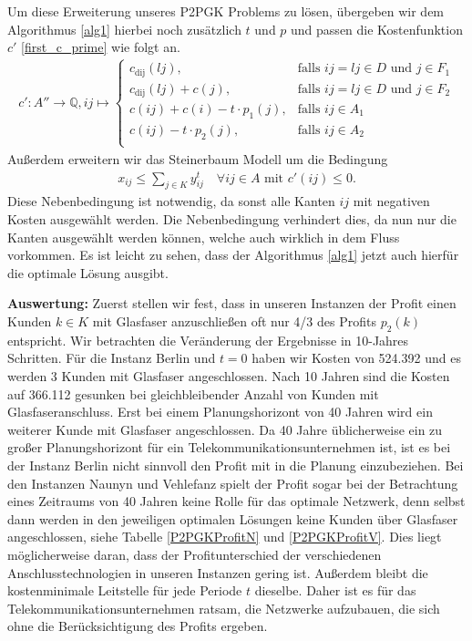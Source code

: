 \documentclass[11pt,a4paper]{article}
\newcommand{\Q}{\mathbb{Q}}
\theoremstyle{my_th_style1}
\begin{document}
Um diese Erweiterung unseres P2PGK Problems zu lösen, übergeben wir dem Algorithmus \ref{alg1} hierbei noch zusätzlich $t$ und $p$ und passen die Kostenfunktion \(c'\) \eqref{first_c_prime} wie folgt an.
\begin{align*}
c': A'' \rightarrow \Q, ij \mapsto \left\{\begin{array}{cl} 
c_{\text{dij}}(lj), & \text{falls } ij = lj \in D \text{ und } j \in F_1\\ 
c_{\text{dij}}(lj)+c(j), & \text{falls } ij = lj \in D \text{ und } j \in F_2\\ 
c(ij) + c(i) - t \cdot p_1(j), & \text{falls } ij \in A_1\\ 
c(ij) - t \cdot p_2(j), & \text{falls } ij \in A_2\\ 
\end{array}
\right.
\end{align*}
Außerdem erweitern wir das Steinerbaum Modell um die Bedingung 
\begin{align*}
	x_{ij} \leq \displaystyle\sum_{j \in K} y_{ij}^t \quad \forall ij \in A \text{ mit } c'(ij) \leq 0.
\end{align*}
Diese Nebenbedingung ist notwendig, da sonst alle Kanten $ij$ mit negativen Kosten ausgewählt werden.
Die Nebenbedingung verhindert dies, da nun nur die Kanten ausgew\"ahlt werden können, welche auch wirklich in dem Fluss vorkommen.
Es ist leicht zu sehen, dass der Algorithmus \ref{alg1} jetzt auch hierfür die optimale Lösung ausgibt. 

\textbf{Auswertung:}
Zuerst stellen wir fest, dass in unseren Instanzen der Profit einen Kunden $k \in K$ mit Glasfaser anzuschließen oft nur 4/3 des Profits $p_2(k)$ entspricht. 
Wir betrachten die Veränderung der Ergebnisse in 10-Jahres Schritten.
Für die Instanz Berlin und $t=0$ haben wir Kosten von 524.392 und es werden 3 Kunden mit Glasfaser angeschlossen.
Nach 10 Jahren sind die Kosten auf 366.112 gesunken bei gleichbleibender Anzahl von Kunden mit Glasfaseranschluss.
Erst bei einem Planungshorizont von 40 Jahren wird ein weiterer Kunde mit Glasfaser angeschlossen.
Da 40 Jahre \"ublicherweise ein zu großer Planungshorizont f\"ur ein Telekommunikationsunternehmen ist, ist es bei der Instanz Berlin nicht sinnvoll den Profit mit in die Planung einzubeziehen.
Bei den Instanzen Naunyn und Vehlefanz spielt der Profit sogar bei der Betrachtung eines Zeitraums von 40 Jahren keine Rolle f\"ur das optimale Netzwerk, denn selbst dann werden in den jeweiligen optimalen L\"osungen keine Kunden \"uber Glasfaser angeschlossen, siehe Tabelle \eqref{P2PGKProfitN} und \eqref{P2PGKProfitV}.
Dies liegt m\"oglicherweise daran, dass der Profitunterschied der verschiedenen Anschlusstechnologien in unseren Instanzen gering ist. Außerdem  bleibt die kostenminimale Leitstelle für jede Periode $t$ dieselbe.
Daher ist es f\"ur das Telekommunikationsunternehmen ratsam, die Netzwerke aufzubauen, die sich ohne die Ber\"ucksichtigung des Profits ergeben.
\end{document}
